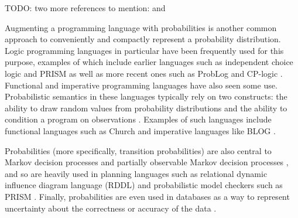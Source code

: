 \documentclass{article}
\begin{document}
TODO: two more references to mention: \cite{DBLP:series/synthesis/2016Raedt} and
\cite{DBLP:series/sci/BrazAR08}

Augmenting a programming language with probabilities is another common approach
to conveniently and compactly represent a probability distribution. Logic
programming languages in particular have been frequently used for this purpose,
examples of which include earlier languages such as independent choice logic
\cite{DBLP:journals/ai/Poole97} and PRISM \cite{DBLP:conf/ijcai/SatoK97} as well
as more recent ones such as ProbLog \cite{DBLP:conf/ijcai/RaedtKT07} and
CP-logic \cite{DBLP:journals/tplp/VennekensDB09}. Functional and imperative
programming languages have also seen some use. Probabilistic semantics in these
languages typically rely on two constructs: the ability to draw random values
from probability distributions and the ability to condition a program on
observations \cite{DBLP:conf/icse/GordonHNR14}. Examples of such languages
include functional languages such as Church \cite{DBLP:conf/uai/GoodmanMRBT08}
and imperative languages like BLOG \cite{DBLP:conf/ijcai/MilchMRSOK05}.

Probabilities (more specifically, transition probabilities) are also central to
Markov decision processes \cite{bellman1957markovian} and partially observable
Markov decision processes \cite{aastrom1965optimal}, and so are heavily used in
planning languages such as relational dynamic influence diagram language (RDDL)
\cite{sanner2010relational} and probabilistic model checkers such as PRISM
\cite{DBLP:conf/cav/KwiatkowskaNP11}. Finally, probabilities are even used in
databases as a way to represent uncertainty about the correctness or accuracy of
the data \cite{DBLP:series/synthesis/2011Suciu}.
\end{document}

